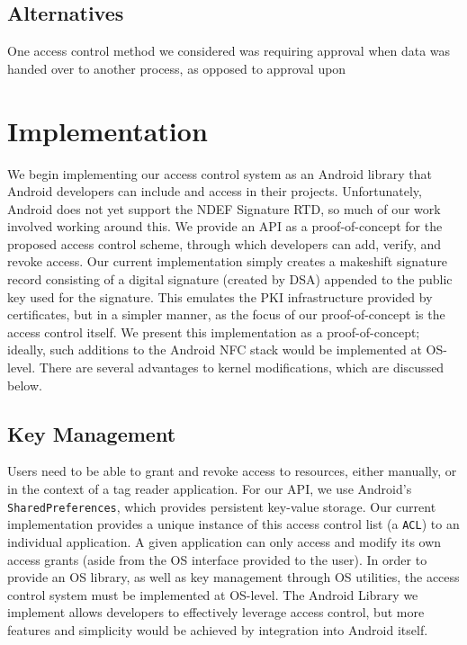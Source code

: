 \documentclass[12pt]{article}
\begin{document}
\subsection{Alternatives}
One access control method we considered was requiring approval when data was handed over to another process, as opposed to approval upon 

\section{Implementation}
We begin implementing our access control system as an Android library that Android developers can include and access in their projects.
Unfortunately, Android does not yet support the NDEF Signature RTD, so much of our work involved working around this.
We provide an API as a proof-of-concept for the proposed access control scheme, through which developers can add, verify, and revoke access.
Our current implementation simply creates a makeshift signature record consisting of a digital signature (created by DSA) appended to the public key used for the signature.
This emulates the PKI infrastructure provided by certificates, but in a simpler manner, as the focus of our proof-of-concept is the access control itself.
We present this implementation as a proof-of-concept; ideally, such additions to the Android NFC stack would be implemented at OS-level.
There are several advantages to kernel modifications, which are discussed below.

\subsection{Key Management}
Users need to be able to grant and revoke access to resources, either manually, or in the context of a tag reader application.
For our API, we use Android's \texttt{SharedPreferences}, which provides persistent key-value storage.
Our current implementation provides a unique instance of this access control list (a \texttt{ACL}) to an individual application.
A given application can only access and modify its own access grants (aside from the OS interface provided to the user).
In order to provide an OS library, as well as key management through OS utilities, the access control system must be implemented at OS-level.
The Android Library we implement allows developers to effectively leverage access control, but more features and simplicity would be achieved by integration into Android itself.
\end{document}

